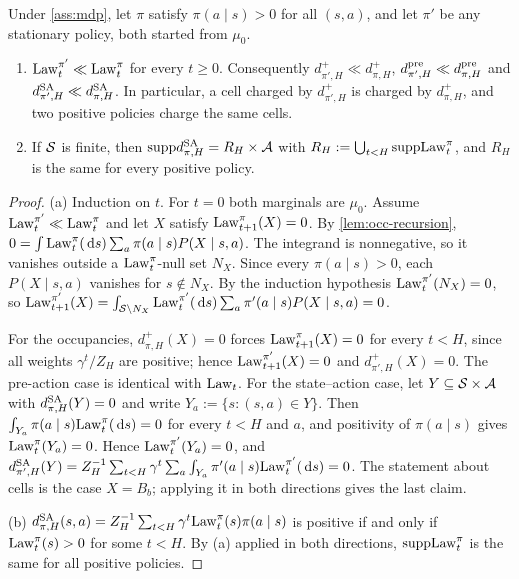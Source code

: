 \begin{lemma}\label{lem:fpg-support}
Under \cref{ass:mdp}, let $\pi$ satisfy $\pi(a\mid s)>0$ for all $(s,a)$, and let $\pi'$ be any stationary policy, both started from $\mu_0$.
\begin{enumerate}[nosep,label=(\alph*)]
\item $\mathrm{Law}^{\pi'}_t\ll\mathrm{Law}^\pi_t$ for every $t\ge0$. Consequently $d^+_{\pi',H}\ll d^+_{\pi,H}$, $d^{\mathrm{pre}}_{\pi',H}\ll d^{\mathrm{pre}}_{\pi,H}$ and $d^{\mathrm{SA}}_{\pi',H}\ll d^{\mathrm{SA}}_{\pi,H}$.
  In particular, a cell charged by $d^+_{\pi',H}$ is charged by $d^+_{\pi,H}$, and two positive policies charge the same cells.
\item If $\mathcal{S}$ is finite, then $\mathrm{supp} d^{\mathrm{SA}}_{\pi,H}=R_H\times\mathcal{A}$ with $R_H:=\bigcup_{t<H}\mathrm{supp}\mathrm{Law}^\pi_t$, and $R_H$ is the same for every positive policy.
\end{enumerate}
\end{lemma}
\begin{proof}
(a) Induction on $t$. For $t=0$ both marginals are $\mu_0$.
Assume $\mathrm{Law}^{\pi'}_t\ll\mathrm{Law}^\pi_t$ and let $X$ satisfy $\mathrm{Law}^\pi_{t+1}(X)=0$.
By \cref{lem:occ-recursion}, $0=\int\mathrm{Law}^\pi_t(\,\mathrm{d} s)\sum_a\pi(a\mid s)P(X\mid s,a)$.
The integrand is nonnegative, so it vanishes outside a $\mathrm{Law}^\pi_t$-null set $N_X$.
Since every $\pi(a\mid s)>0$, each $P(X\mid s,a)$ vanishes for $s\notin N_X$.
By the induction hypothesis $\mathrm{Law}^{\pi'}_t(N_X)=0$, so
$\mathrm{Law}^{\pi'}_{t+1}(X)=\int_{\mathcal{S}\setminus N_X}\mathrm{Law}^{\pi'}_t(\,\mathrm{d} s)\sum_a\pi'(a\mid s)P(X\mid s,a)=0$.

For the occupancies, $d^+_{\pi,H}(X)=0$ forces $\mathrm{Law}^\pi_{t+1}(X)=0$ for every $t<H$, since all weights $\gamma^t/Z_H$ are positive; hence $\mathrm{Law}^{\pi'}_{t+1}(X)=0$ and $d^+_{\pi',H}(X)=0$.
The pre-action case is identical with $\mathrm{Law}_t$.
For the state--action case, let $Y\subseteq\mathcal{S}\times\mathcal{A}$ with $d^{\mathrm{SA}}_{\pi,H}(Y)=0$ and write $Y_a:=\{s:(s,a)\in Y\}$.
Then $\int_{Y_a}\pi(a\mid s)\mathrm{Law}^\pi_t(\,\mathrm{d} s)=0$ for every $t<H$ and $a$, and positivity of $\pi(a\mid s)$ gives $\mathrm{Law}^\pi_t(Y_a)=0$.
Hence $\mathrm{Law}^{\pi'}_t(Y_a)=0$, and $d^{\mathrm{SA}}_{\pi',H}(Y)=Z_H^{-1}\sum_{t<H}\gamma^t\sum_a\int_{Y_a}\pi'(a\mid s)\mathrm{Law}^{\pi'}_t(\,\mathrm{d} s)=0$.
The statement about cells is the case $X=B_b$; applying it in both directions gives the last claim.

(b) $d^{\mathrm{SA}}_{\pi,H}(s,a)=Z_H^{-1}\sum_{t<H}\gamma^t\mathrm{Law}^\pi_t(s)\pi(a\mid s)$ is positive if and only if $\mathrm{Law}^\pi_t(s)>0$ for some $t<H$.
By (a) applied in both directions, $\mathrm{supp}\mathrm{Law}^\pi_t$ is the same for all positive policies.
\end{proof}

